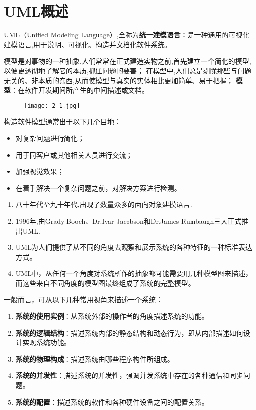 \documentclass[../main.tex]{subfiles}
\begin{document}
\section{UML概述}
UML（Unified Modeling Language）,全称为\textbf{统一建模语言}：是一种通用的可视化建模语言,用于说明、可视化、构造并文档化软件系统。

模型是对事物的一种抽象,人们常常在正式建造实物之前,首先建立一个简化的模型,以便更透彻地了解它的本质,抓住问题的要害；
在模型中,人们总是剔除那些与问题无关的、非本质的东西,从而使模型与真实的实体相比更加简单、易于把握；
\textbf{模型}：在软件开发期间所产生的中间描述或文档。
\begin{figure}[H]
  \texttt{[image: 2\_1.jpg]}
\end{figure}
构造软件模型通常出于以下几个目地：
\begin{itemize}
  \item 对复杂问题进行简化；
  \item 用于同客户或其他相关人员进行交流；
  \item 加强视觉效果；
  \item 在着手解决一个复杂问题之前，对解决方案进行检测。
\end{itemize}
\begin{enumerate}
  \item 八十年代至九十年代,出现了数量众多的面向对象建模语言.
  \item 1996年,由Grady Booch、Dr.Ivar Jacobson和Dr.James Rumbaugh三人正式推出UML.
  \item UML为人们提供了从不同的角度去观察和展示系统的各种特征的一种标准表达方式。
  \item UML中，从任何一个角度对系统所作的抽象都可能需要用几种模型图来描述，而这些来自不同角度的模型图最终组成了系统的完整模型。
\end{enumerate}
一般而言，可从以下几种常用视角来描述一个系统：
\begin{enumerate}
  \item \textbf{系统的使用实例}：从系统外部的操作者的角度描述系统的功能。
  \item \textbf{系统的逻辑结构}：描述系统内部的静态结构和动态行为，即从内部描述如何设计实现系统功能。
  \item \textbf{系统的物理构成}：描述系统由哪些程序构件所组成。
  \item \textbf{系统的并发性}：描述系统的并发性，强调并发系统中存在的各种通信和同步问题。
  \item \textbf{系统的配置}：描述系统的软件和各种硬件设备之间的配置关系。
\end{enumerate}
\end{document}
